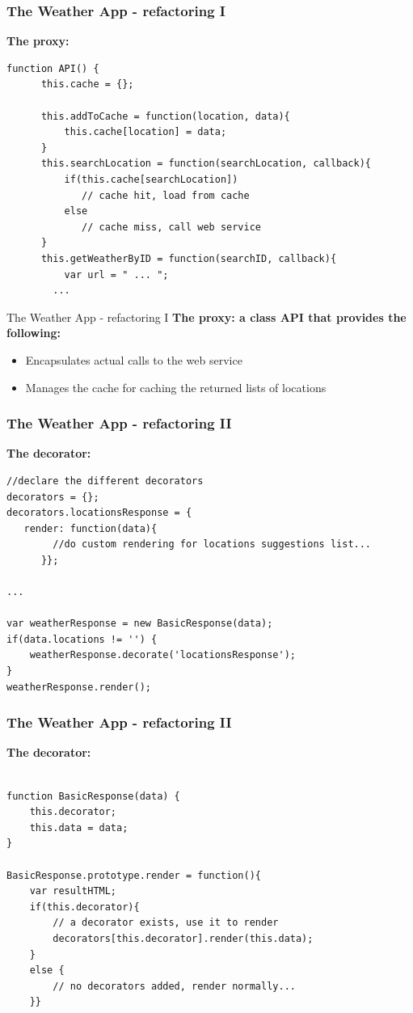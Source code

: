 \documentclass{beamer}
\begin{document}
\begin{frame}[fragile]
\frametitle{The Weather App - refactoring I}
\textbf{The proxy:}
\begin{lstlisting}
function API() {
	  this.cache = {};
	  
	  this.addToCache = function(location, data){
		  this.cache[location] = data; 
	  }
	  this.searchLocation = function(searchLocation, callback){
		  if(this.cache[searchLocation])
		     // cache hit, load from cache
		  else
		     // cache miss, call web service
	  }
	  this.getWeatherByID = function(searchID, callback){
		  var url = " ... ";
        ...
\end{lstlisting}
\end{frame}

\begin{frame}{The Weather App - refactoring I}
\textbf{The proxy: a class API that provides the following:}
   \begin{itemize}
    \item Encapsulates actual calls to the web service
    \item Manages the cache for caching the returned lists of locations
    \end{itemize}
\end{frame}

\begin{frame}[fragile]
\frametitle{The Weather App - refactoring II}
\textbf{The decorator:}
\begin{lstlisting}
//declare the different decorators
decorators = {};
decorators.locationsResponse = {
   render: function(data){
		//do custom rendering for locations suggestions list...
	  }};
	  
...

var weatherResponse = new BasicResponse(data); 
if(data.locations != '') {
    weatherResponse.decorate('locationsResponse');
}
weatherResponse.render();

\end{lstlisting}
\end{frame}

\begin{frame}[fragile]
\frametitle{The Weather App - refactoring II}
\textbf{The decorator:}
\begin{lstlisting}

function BasicResponse(data) {
    this.decorator;
    this.data = data;
}

BasicResponse.prototype.render = function(){
	var resultHTML;
	if(this.decorator){
		// a decorator exists, use it to render	
	    decorators[this.decorator].render(this.data);
	}
	else {
		// no decorators added, render normally...
	}} 

\end{lstlisting}
\end{frame}
\end{document}
